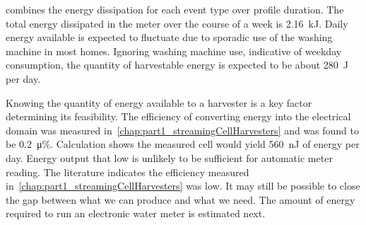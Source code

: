      combines the energy dissipation for each event type over profile duration.
    The total energy dissipated in the meter over the course of a week is \SI{2.16}{\kilo\joule}.
    Daily energy available is expected to fluctuate due to sporadic use of the washing machine in most homes.
    Ignoring washing machine use, indicative of weekday consumption, the quantity of harvestable energy is expected to be about \SI{280}{\joule} per day.

    Knowing the quantity of energy available to a harvester is a key factor determining its feasibility.
    The efficiency of converting energy into the electrical domain was measured in~\cref{chap:part1_streamingCellHarvesters} and was found to be \SI{0.2}{\micro\percent}.
    Calculation shows the measured cell would yield \SI{560}{\nano\joule} of energy per day.
    Energy output that low is unlikely to be sufficient for automatic meter reading.
    The literature indicates the efficiency measured in~\cref{chap:part1_streamingCellHarvesters} was low.
    It may still be possible to close the gap between what we can produce and what we need.
    The amount of energy required to run an electronic water meter is estimated next.
